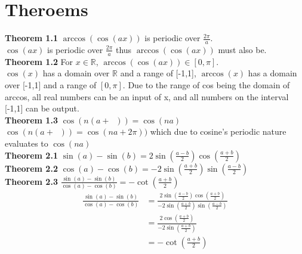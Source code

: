 \documentclass[11pt]{article}
\DeclareMathOperator{\period}{\frac{2\pi}{n}}
\begin{document}
\section{Theroems}
\textbf{Theorem 1.1} \(\arccos(\cos(ax))\) is periodic over \(\frac{2\pi}{a}\).\\
\(\cos(ax)\) is periodic over \(\frac{2\pi}{a}\) thus \(\arccos(\cos(ax))\) must also be.\\
\textbf{Theorem 1.2} For \(x\in\mathbb{R}\), \(\arccos(\cos(ax))\in[0,\pi]\).\\
\(\cos(x)\) has a domain over \(\mathbb{R}\) and a range of [-1,1], \(\arccos(x)\) has a domain over [-1,1] and a range of \([0,\pi]\). Due to the range of cos being the domain of arccos, all real numbers can be an input of x, and all numbers on the interval [-1,1] can be output.\\
\textbf{Theorem 1.3} \(\cos(n(a+\period))=\cos(na)\)\\
\(\cos(n(a+\period))=\cos(na+2\pi))\) which due to cosine's periodic nature evaluates to \(\cos(na)\)\\
\textbf{Theorem 2.1} \(\sin(a)-\sin(b)=2\sin(\frac{a-b}{2})\cos(\frac{a+b}{2})\)\\
\textbf{Theorem 2.2} \(\cos(a)-\cos(b)=-2\sin(\frac{a+b}{2})\sin(\frac{a-b}{2})\)\\
\textbf{Theorem 2.3} \(\frac{\sin(a)-\sin(b)}{\cos(a)-\cos(b)}=-\cot(\frac{a+b}{2})\)\\
\begin{equation*}
\begin{split}
\frac{\sin(a)-\sin(b)}{\cos(a)-\cos(b)}&=\frac{2\sin(\frac{a-b}{2})\cos(\frac{a+b}{2})}{-2\sin(\frac{a+b}{2})\sin(\frac{a-b}{2})}\\
&=\frac{2\cos(\frac{a+b}{2})}{-2\sin(\frac{a+b}{2})}\\
&=-\cot(\frac{a+b}{2})
\end{split}
\end{equation*}

\pagebreak
\end{document}
